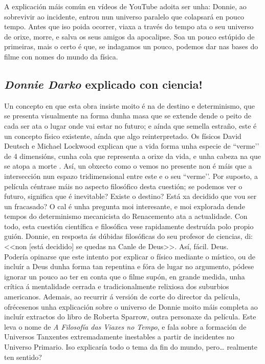 \begin{refsection}
\begin{multicols}{2}
A explicación máis común en vídeos de YouTube adoita ser unha: Donnie, ao
sobrevivir ao incidente, entrou nun universo paralelo que colapsará en pouco
tempo. Antes que iso poida ocorrer, viaxa a través do tempo ata o seu universo
de orixe, morre, e salva os seus amigos da apocalipse. Soa un pouco estúpido de
primeiras, mais o certo é que, se indagamos un pouco, podemos dar nas bases do
filme con nomes do mundo da física.

\subsection*{\textit{Donnie Darko} explicado con ciencia!}

Un concepto en que esta obra insiste moito é na de destino e determinismo, que
se presenta visualmente na forma dunha masa que se extende dende o peito de
cada ser ata o lugar onde vai estar no futuro; e aínda que semella estraño,
este é un concepto físico existente, aínda que algo reinterpretado. Os físicos
David Deutsch e Michael Lockwood explican que a vida forma unha especie de
``verme’' de 4 dimensións, cunha cola que representa a orixe da vida, e unha
cabeza na que se atopa a morte \cite{deutsch.m_1994}. Así, un obxecto como
o vemos no presente non é máis que a intersección nun espazo tridimensional
entre este e o seu ``verme'’.  Por suposto, a película céntrase máis no aspecto
filosófico desta cuestión; se podemos ver o futuro, significa que é inevitable?
Existe o destino? Está xa decidido que vou ser un fracasado? O cal é unha
pregunta moi interesante, e moi explorada dende tempos do determinismo
mecanicista do Renacemento ata a actualidade. Con todo, esta cuestión
científica e filosófica vese rapidamente destruída polo propio guión. Donnie,
en resposta ás dúbidas filosóficas do seu profesor de ciencias, di: <<non [está
decidido] se quedas na Canle de Deus>>\cite{donnie_darko}.
Así, fácil. Deus.\\

Podería opinarse que este intento por explicar o físico mediante o místico, ou
de incluír a Deus dunha forma tan repentina e fóra de lugar no argumento,
pódese ignorar un pouco ao ter en conta que o filme supón, en grande medida,
unha crítica á mentalidade cerrada e tradicionalmente relixiosa dos suburbios
americanos. Ademais, ao recurrir á versión de corte do director da película,
ofrécesenos unha explicación sobre o universo de Donnie moito máis completa ao
incluír extractos do libro de Roberta Sparrow, outra personaxe da película.
Este leva o nome de \textit{A Filosofía das Viaxes no Tempo}, e fala sobre a
formación de Universos Tanxentes extremadamente inestables a partir de
incidentes no Universo Primario. Iso explicaría todo o tema da fin do mundo,
pero… realmente ten sentido?


\end{multicols}
\end{refsection}

